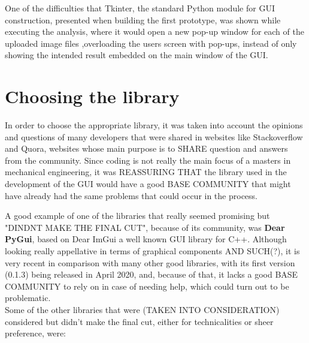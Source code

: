 
One of the difficulties that Tkinter, the standard Python module for GUI construction, presented when building the first prototype, was shown while executing the analysis, where it would open a new pop-up window for each of the uploaded image files ,overloading the users screen with pop-ups, instead of only showing the intended result embedded on the main window of the GUI.\\


\section{Choosing the library} %
\label{sub:choosing_the_library}

In order to choose the appropriate library, it was taken into account the opinions and questions of many developers that were shared in websites like Stackoverflow and Quora, websites whose main purpose is to SHARE question and answers from the community. Since coding is not really the main focus of a masters in mechanical engineering, it was REASSURING THAT the library used in the development of the GUI would have a good BASE COMMUNITY that might have already had the same problems that could occur in the process.

A good example of one of the libraries that really seemed promising but "DINDNT MAKE THE FINAL CUT", because of its community, was \textbf{Dear PyGui}, based on Dear ImGui a well known GUI library for C++. Although looking really appellative in terms of graphical components AND SUCH(?), it is very recent in comparison with many other good libraries, with its first version (0.1.3) being released in April 2020, and, because of that, it lacks a good BASE COMMUNITY to rely on in case of needing help, which could turn out to be problematic.\\

Some of the other libraries that were (TAKEN INTO CONSIDERATION) considered but didn't make the final cut, either for technicalities or sheer preference, were:

